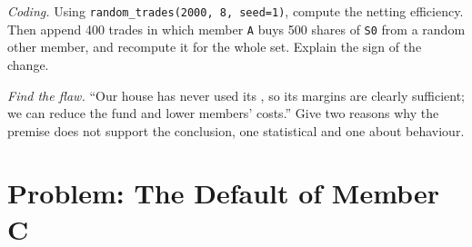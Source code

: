 \begin{exercise}[$\star\star\star$]\label{exo:m1:clearing-and-settlement:7}
\emph{Coding.} Using \texttt{random\_trades(2000, 8, seed=1)}, compute the
netting efficiency. Then append 400 trades in which member \texttt{A} buys
500 shares of \texttt{S0} from a random other member, and recompute it for
the whole set. Explain the sign of the change.
\end{exercise}

\begin{exercise}[$\star\star\star$]\label{exo:m1:clearing-and-settlement:8}
\emph{Find the flaw.} ``Our  house has never used its ,
so its margins are clearly sufficient; we can reduce the fund and lower
members' costs.'' Give two reasons why the premise does not support the
conclusion, one statistical and one about behaviour.
\end{exercise}

\section{Problem: The Default of Member C}

